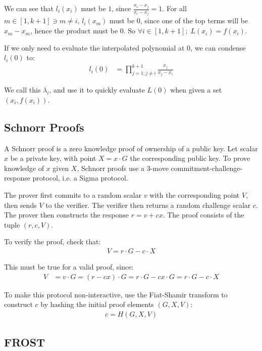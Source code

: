\documentclass{article}
\theoremstyle{definition}
\theoremstyle{remark}
\begin{document}
We can see that $l_i(x_i)$ must be $1$, since $\frac{x_i - x_j}{x_i - x_j} = 1$.  For all $m \in [1, k+1] \ni m \neq i$, $l_i(x_m)$ must be $0$, since one of the top terms will be $x_m - x_m$, hence the product must be $0$.  So $\forall i \in [1,k+1];\; L(x_i) = f(x_i)$.

If we only need to evaluate the interpolated polynomial at $0$, we can condense $l_i(0)$ to:
\begin{align}
  l_i(0) &= \prod_{j=1; j \neq i}^{k+1} \frac{x_j}{x_j - x_i}
\end{align}

We call this $\lambda_i$, and use it to quickly evaluate $L(0)$ when given a set $(x_i, f(x_i))$.

\newpage
\onecolumn

\subsection{
  Schnorr Proofs
}

A Schnorr proof \cite{schnorr} is a zero knowledge proof of ownership of a public key.  Let scalar $x$ be a private key, with point $X = x \cdot G$ the corresponding public key.  To prove knowledge of $x$ given $X$, Schnorr proofs use a $3$-move commitment-challenge-response protocol, i.e. a Sigma protocol.

The prover first commits to a random scalar $v$ with the corresponding point $V$, then sends $V$ to the verifier.  The verifier then returns a random challenge scalar $c$.  The prover then constructs the response $r = v + cx$.  The proof consists of the tuple $(r, c, V)$.

To verify the proof, check that:
\begin{align}
  V = r \cdot G - c \cdot X
\end{align}

This must be true for a valid proof, since:
\begin{align}
  V &= v \cdot G = (r - cx) \cdot G = r \cdot G - cx \cdot G = r \cdot G - c \cdot X\nonumber
\end{align}

To make this protocol non-interactive, use the Fiat-Shamir transform \cite{fiatshamir} to construct $c$ by hashing the initial proof elements $(G, X, V)$:
\begin{align}
  c = H(G, X, V)
\end{align}

\subsection{
  FROST
}
\end{document}
